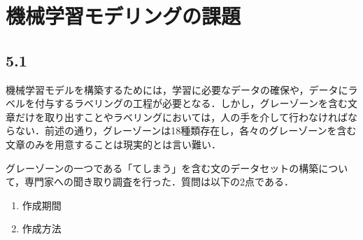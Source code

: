 \chapter{機械学習モデリングの課題 \label{c5}}

\section{5.1 \label{c5s1}}
機械学習モデルを構築するためには，学習に必要なデータの確保や，データにラベルを付与するラベリングの工程が必要となる．しかし，グレーゾーンを含む文章だけを取り出すことやラベリングにおいては，人の手を介して行わなければならない．前述の通り，グレーゾーンは18種類存在し，各々のグレーゾーンを含む文章のみを用意することは現実的とは言い難い．

グレーゾーンの一つである「てしまう」を含む文のデータセットの構築について，専門家への聞き取り調査を行った．質問は以下の2点である．
\begin{enumerate}
    \item 作成期間
    \item 作成方法
\end{enumerate}



